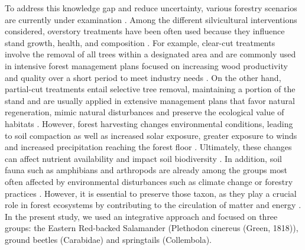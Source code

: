 To address this knowledge gap and reduce uncertainty, various forestry scenarios are currently under examination \citep{royoDesiredREgenerationAssisted2023}. 
Among the different silvicultural interventions considered, overstory treatments have been often used because they influence stand growth, health, and composition \citep{Man2008Elevenyearresponses,Chaudhary2016Impactforest,MontoroGirona2018ConiferRegeneration,Ameray2021Forestcarbon}. 
For example, clear-cut treatments involve the removal of all trees within a designated area and are commonly used in intensive forest management plans focused on increasing wood productivity and quality over a short period to meet industry needs \citep{Ameray2021Forestcarbon}. 
On the other hand, partial-cut treatments entail selective tree removal, maintaining a portion of the stand and are usually applied in extensive management plans that favor natural regeneration, mimic natural disturbances and preserve the ecological value of habitats \citep{Barg1999Influencepartial,Irland2011Timberproductivity,Tong2020Forestmanagement,Ameray2021Forestcarbon}. 
However, forest harvesting changes environmental conditions, leading to soil compaction as well as increased solar exposure, greater exposure to winds and increased precipitation reaching the forest floor \citep{Keenan1993ecologicaleffects,Lindo2003Microbialbiomass,Heithecker2007Edgerelatedgradients}. 
Ultimately, these changes can affect nutrient availability and impact soil biodiversity \citep{Covington1981Changesforest,Lindo2003Microbialbiomass,Battigelli2004Shorttermimpact,rousseauLongtermEffectsBiomass2018}.
In addition, soil fauna such as amphibians and arthropods are already among the groups most often affected by environmental disturbances such as climate change \citep{Alford1999Globalamphibian,Houlahan2000Quantitativeevidence,Pounds2006Widespreadamphibian,Warren2018projectedeffect} or forestry practices \citep{Stuart2004Statustrends,Semlitsch2009Effectstimber,Hartshorn2021reviewforest}.
However, it is essential to preserve those taxon, as they play a crucial role in forest ecosystems by contributing to the circulation of matter and energy \citep{Seibold2021contributioninsects,Kudrin2023metaanalysiseffects}. 
In the present study, we used an integrative approach and focused on three groups: the Eastern Red-backed Salamander (Plethodon cinereus (Green, 1818)), ground beetles (Carabidae) and springtails (Collembola).

